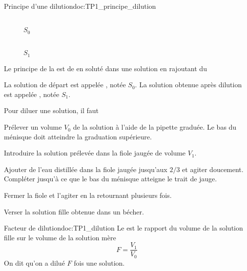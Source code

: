 \begin{doc}{Principe d'une dilution}{doc:TP1_principe_dilution}
  \begin{wrapfigure}[5]{r}{0.5\linewidth}
    \vspace*{-32pt}
    \centering
    \begin{multicols}{4}
     \\[0pt]
    \footnotesize{$S_0$}
    
    
    
     \\[0pt]
    \footnotesize{$S_1$}
    \end{multicols}
  \end{wrapfigure}
  \vAligne{-40pt}
  
  \begin{importants}
    Le principe de la  est de  en soluté dans une solution en rajoutant du 
  \end{importants}
  La solution de départ est appelée , notée $S_0$.
  La solution obtenue après dilution est appelée , notée $S_1$.

  Pour diluer une solution, il faut
  \begin{protocole}
    \item Prélever un volume $V_0$ de la solution à l'aide de la pipette graduée.
    Le bas du ménisque doit atteindre la graduation supérieure.
    \item Introduire la solution prélevée dans la fiole jaugée de volume $V_1$.
    \item Ajouter de l'eau distillée dans la fiole jaugée jusqu'aux $2/3$ et agiter doucement. Compléter jusqu'à ce que le bas du ménisque atteigne le trait de jauge.
    \item Fermer la fiole et l'agiter en la retournant plusieurs fois.
    \item Verser la solution fille obtenue dans un bécher.
  \end{protocole}
\end{doc}


\begin{doc}{Facteur de dilution}{doc:TP1_dilution}  
  Le  est le rapport du volume de la solution fille sur le volume de la solution mère
  \begin{equation*}
    F = \frac{V_\text{1}}{V_\text{0}}
  \end{equation*}
  On dit qu'on a dilué $F$ fois une solution.
\end{doc}


